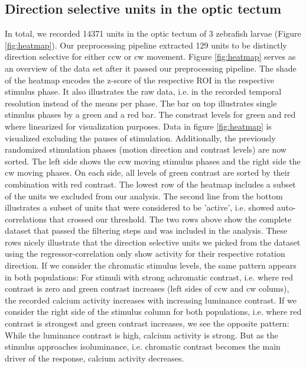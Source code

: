 \subsection{Direction selective units in the optic tectum}

In total, we recorded 14371 units in the optic tectum of 3 zebrafish larvae (Figure \ref{fig:heatmap}). Our preprocessing pipeline extracted 129 units to be distinctly direction selective for either ccw or cw movement. Figure \ref{fig:heatmap} serves as an overview of the data set after it passed our preprocessing pipeline. The shade of the heatmap encodes the z-score of the respective ROI in the respective stimulus phase. It also illustrates the raw data, i.e. in the recorded temporal resolution instead of the means per phase. The bar on top illustrates single stimulus phases by a green and a red bar. The constrast levels for green and red where linearized for visualization purposes. Data in figure \ref{fig:heatmap} is visualized excluding the pauses of stimulation. Additionally, the previously randomized stimulation phases (motion direction and contrast levels) are now sorted. The left side shows the ccw moving stimulus phases and the right side the cw moving phases. On each side, all levels of green contrast are sorted by their combination with red contrast. The lowest row of the heatmap includes a subset of the units we excluded from our analysis. The second line from the bottom illustrates a subset of units that were considered to be 'active', i.e. showed auto-correlations that crossed our threshold. The two rows above show the complete dataset that passed the filtering steps and was included in the analysis. These rows nicely illustrate that the direction selective units we picked from the dataset using the regressor-correlation only show activity for their respective rotation direction. If we consider the chromatic stimulus levels, the same pattern appears in both populations: For stimuli with strong achromatic contrast, i.e. where red contrast is zero and green contrast increases (left sides of ccw and cw colums), the recorded calcium activity increases with increasing luminance contrast. If we consider the right side of the stimulus column for both populations, i.e. where red contrast is strongest and green contrast increases, we see the opposite pattern: While the luminance contrast is high, calcium activity is strong. But as the stimulus approaches isoluminance, i.e. chromatic contrast becomes the main driver of the response, calcium activity decreases.

